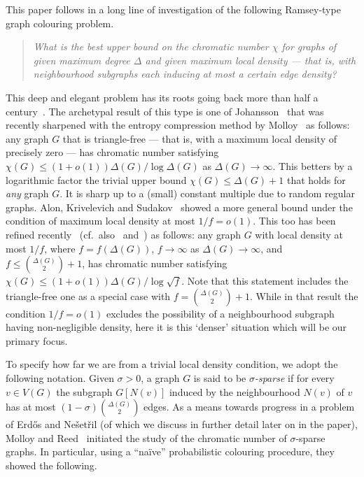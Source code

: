 

This paper follows in a long line of investigation of the following Ramsey-type graph colouring problem.
\begin{quote}\em
What is the best upper bound on the chromatic number $\chi$ for graphs of given maximum degree $\Delta$ and given maximum local density --- that is, with neighbourhood subgraphs each inducing at most a certain edge density?
\end{quote}
This deep and elegant problem has its roots going back more than half a century~\cite{Viz68}.
The archetypal result of this type is one of Johansson~\cite{Joh96} that was recently sharpened with the entropy compression method by Molloy~\cite{Mol19} as follows: any graph $G$ that is triangle-free --- that is, with a maximum local density of precisely zero --- has chromatic number satisfying $\chi(G)\le(1+o(1))\Delta(G)/\log\Delta(G)$ as $\Delta(G)\to\infty$.
This betters by a logarithmic factor the trivial upper bound $\chi(G)\le \Delta(G)+1$ that holds for {\em any} graph $G$.
It is sharp up to a (small) constant multiple due to random regular graphs.
Alon, Krivelevich and Sudakov~\cite{AKS99} showed a more general bound under the condition of maximum local density at most $1/f=o(1)$. This too has been refined recently~\cite{DKPS20+} (cf.~also~\cite{DJKP18+} and~\cite{DKPS20+b}) as follows: any graph $G$ with local density at most $1/f$, where $f=f(\Delta(G))$, $f \to\infty$ as $\Delta(G)\to\infty$, and $f\le \binom{\Delta(G)}2+1$, has chromatic number satisfying $\chi(G)\le(1+o(1))\Delta(G)/\log\sqrt{f}$. Note that this statement includes the triangle-free one as a special case with $f=\binom{\Delta(G)}2+1$. While in that result the condition $1/f=o(1)$ excludes the possibility of a neighbourhood subgraph having non-negligible density, here it is this `denser' situation which will be our primary focus.


To specify how far we are from a trivial local density condition, we adopt the following notation. Given $\sigma>0$, a graph $G$ is said to be {\em $\sigma$-sparse} if for every $v\in V(G)$ the subgraph $G[N(v)]$ induced by the neighbourhood $N(v)$ of $v$ has at most $(1-\sigma)\binom{\Delta(G)}2$ edges.
As a means towards progress in a problem of Erd\H{o}s and Ne\v{s}et\v{r}il (of which we discuss in further detail later on in the paper), Molloy and Reed~\cite{MoRe97} initiated the study of the chromatic number of $\sigma$-sparse graphs. In particular, using a ``na\"ive'' probabilistic colouring procedure, they showed the following.

